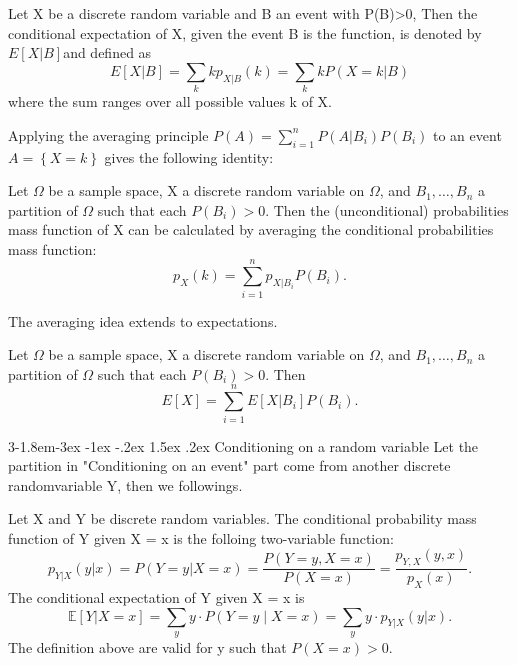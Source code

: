 \documentclass{tufte-handout}
\makeatletter
\renewcommand{\subsection}{\@startsection{subsection}%
    {3}{-1.8em}{-3ex \@plus -1ex \@minus -.2ex}%
    {1.5ex \@plus .2ex}
    {\hspace*{-5.5em}\fcolorbox{ltblue}{ltblue}{\parbox[c][1.0ex][b]{4em}{\phantom{space}}}
    \normalfont\large\itshape\color{ltblue}}}
\makeatother
\begin{document}
    \begin{Definition}
        Let X be a discrete random variable and B an event with P(B)>0, Then the conditional
        expectation of X, given the event B is the function, is denoted by $ E[X|B ] $and defined as
        \[E[X|B]=\sum_k k p_{X|B }(k) = \sum_k k P(X=k|B)\]
        where the sum ranges over all possible values k of X.
    \end{Definition}
    
    Applying the averaging principle $ P(A)=\sum_{i=1}^{n}P(A|B_i)P(B_i) $ to an event $ A = \left\{ X=k \right\} $ gives
    the following identity:
    
    \begin{Theorem}
        Let $ \Omega $ be a sample space, X a discrete random variable on $ \Omega $, and $ B_1, \dots, B_n  $
        a partition of $ \Omega $ such that each $ P(B_i)>0 $. Then the (unconditional) 
        probabilities mass function of X can be calculated by averaging the conditional
        probabilities mass function:
        \[p_X(k) = \sum_{i=1}^{n }p_{X|B_i }P(B_i ).\]
    \end{Theorem}

    The averaging idea extends to expectations.
    \begin{Theorem}
        Let $ \Omega $ be a sample space, X a discrete random variable on $ \Omega $, and $ B_1, \dots, B_n  $
        a partition of $ \Omega $ such that each $ P(B_i )>0 $. Then
        \[E[X]=\sum_{i=1}^{n }E[X|B_i]P(B_i).\]
    \end{Theorem}



    \subsection{Conditioning on a random variable}
    Let the partition in "Conditioning on an event" part come from another discrete randomvariable Y, 
    then we followings.
    \begin{Definition}
        Let X and Y be discrete random variables. The conditional probability mass function of Y given X = x is
        the folloing two-variable function:
        \[p_{Y|X}(y|x)=P(Y=y|X=x)=\frac{P(Y=y,X=x )}{P(X=x)}=\frac{p_{Y,X}(y,x)}{p_X(x)}.\]
        The conditional expectation of Y given X = x is
        \[\mathbb{E }[Y|X=x ] = \sum_y y \cdot P(Y = y \mid X = x)=\sum_y y \cdot p_{Y|X}(y|x).\]
        The definition above are valid for y such that $P(X=x)>0$.
    \end{Definition}
\end{document}
